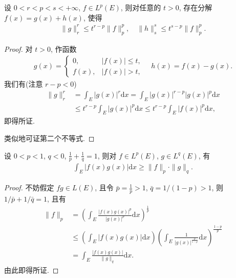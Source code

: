 \documentclass[../../main.tex]{subfiles}%
\begin{document}
\begin{example}
设 $0<r<p<s<+\infty$, $f\in L^p(E)$, 则对任意的 $t>0$, 存在分解 $f(x)=g(x)+h(x)$, 使得
\begin{align*}
\|g\|_r^r \leqslant t^{r-p} \|f\|_p^p, \quad \|h\|_s^s \leqslant t^{s-p} \|f\|_p^p.
\end{align*}
\end{example}

\begin{proof}

对 $t>0$, 作函数
\begin{align*}
g(x) =
\begin{cases}
0, & |f(x)|\leqslant t, \\
f(x), & |f(x)|>t,
\end{cases}
\quad h(x)=f(x)-g(x).
\end{align*}
我们有(注意 $r-p<0$)
\begin{align*}
\|g\|_r^r &= \int_E |g(x)|^r \mathrm{d}x = \int_E |g(x)|^{r-p} |g(x)|^p \mathrm{d}x \\
&\leqslant t^{r-p} \int_E |g(x)|^p \mathrm{d}x \leqslant t^{r-p} \int_E |f(x)|^p \mathrm{d}x,
\end{align*}
即得所证.

类似地可证第二个不等式.

\end{proof}

\begin{theorem}\label{theorem:反向Hölder不等式}
设 $0<p<1$, $q<0$, $\frac{1}{p}+\frac{1}{q}=1$, 则对 $f\in L^p(E)$, $g\in L^q(E)$, 有
\begin{align*}
\int_E |f(x)g(x)|\mathrm{d}x \geqslant \|f\|_p \cdot \|g\|_q.
\end{align*}
\end{theorem}
\begin{proof}

不妨假定 $fg\in L(E)$, 且令 $\bar{p}=\frac{1}{p}>1$, $\bar{q}=1/(1-p)>1$, 则 $1/\bar{p}+1/\bar{q}=1$, 且有
\begin{align*}
\|f\|_p &= \left( \int_E \frac{|f(x)g(x)|^p}{|g(x)|^p} \mathrm{d}x \right)^{\frac{1}{p}} \\
&\leqslant \left( \int_E |f(x)g(x)|\mathrm{d}x \right) \left( \int_E \frac{1}{|g(x)|^{\frac{p}{1-p}}} \mathrm{d}x \right)^{\frac{1-p}{p}} \\
&= \int_E \frac{|f(x)g(x)|}{\|g\|_q} \mathrm{d}x.
\end{align*}
由此即得所证.

\end{proof}
\end{document}
